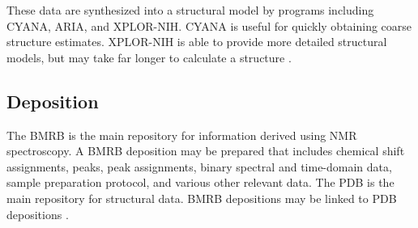 These data are synthesized into a structural model by programs including CYANA,
ARIA, and XPLOR-NIH.  CYANA is useful for quickly obtaining coarse structure
estimates.  XPLOR-NIH is able to provide more detailed structural models, but
may take far longer to calculate a structure \cite{xplor-nih, cyana2004}.

\subsection*{Deposition}

The BMRB is the main repository for information derived using NMR spectroscopy.
A BMRB deposition may be prepared that includes chemical shift assignments,
peaks, peak assignments, binary spectral and time-domain data, sample 
preparation protocol, and various other relevant data.  The PDB is the main 
repository for structural data.  BMRB depositions may be linked to PDB
depositions \cite{bmrb, pdb}.





